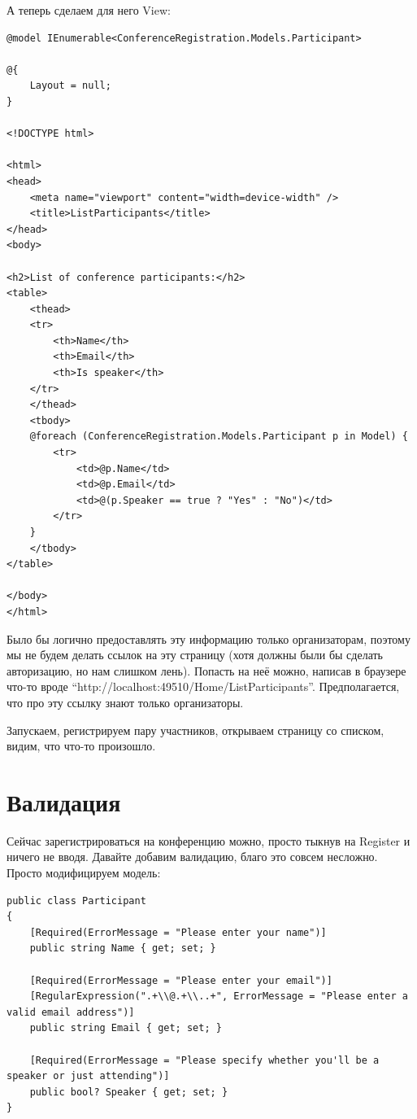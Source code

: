 \documentclass[a5paper]{article}
\begin{document}
А теперь сделаем для него View:

\begin{verbatim}
@model IEnumerable<ConferenceRegistration.Models.Participant>

@{
    Layout = null;
}

<!DOCTYPE html>

<html>
<head>
    <meta name="viewport" content="width=device-width" />
    <title>ListParticipants</title>
</head>
<body>

<h2>List of conference participants:</h2>
<table>
    <thead>
    <tr>
        <th>Name</th>
        <th>Email</th>
        <th>Is speaker</th>
    </tr>
    </thead>
    <tbody>
    @foreach (ConferenceRegistration.Models.Participant p in Model) {
        <tr>
            <td>@p.Name</td>
            <td>@p.Email</td>
            <td>@(p.Speaker == true ? "Yes" : "No")</td>
        </tr>
    }
    </tbody>
</table>

</body>
</html>
\end{verbatim}

Было бы логично предоставлять эту информацию только организаторам, поэтому мы не будем делать ссылок на эту страницу (хотя должны были бы сделать авторизацию, но нам слишком лень). Попасть на неё можно, написав в браузере что-то вроде ``http://localhost:49510/Home/ListParticipants''.
Предполагается, что про эту ссылку знают только организаторы.

Запускаем, регистрируем пару участников, открываем страницу со списком, видим, что что-то произошло.

\section{Валидация}

Сейчас зарегистрироваться на конференцию можно, просто тыкнув на Register и ничего не вводя. Давайте добавим валидацию, благо это совсем несложно. Просто модифицируем модель:

\begin{verbatim}
public class Participant
{
    [Required(ErrorMessage = "Please enter your name")]
    public string Name { get; set; }

    [Required(ErrorMessage = "Please enter your email")]
    [RegularExpression(".+\\@.+\\..+", ErrorMessage = "Please enter a valid email address")]
    public string Email { get; set; }

    [Required(ErrorMessage = "Please specify whether you'll be a speaker or just attending")]
    public bool? Speaker { get; set; }
}
\end{verbatim}
\end{document}
